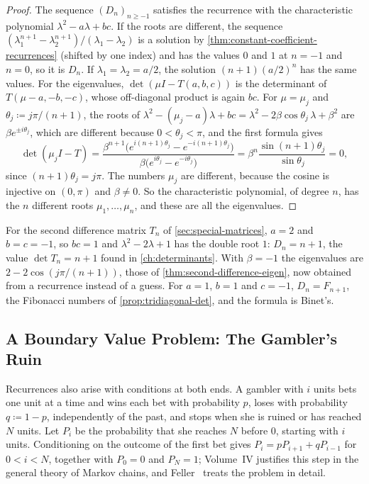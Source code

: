 \begin{proof}
The sequence $(D_n)_{n\ge-1}$ satisfies the recurrence with the characteristic polynomial $\lambda^2-a\lambda+bc$. If the roots are different, the sequence $(\lambda_1^{n+1}-\lambda_2^{n+1})/(\lambda_1-\lambda_2)$ is a solution by \cref{thm:constant-coefficient-recurrences} (shifted by one index) and has the values $0$ and $1$ at $n=-1$ and $n=0$, so it is $D_n$. If $\lambda_1=\lambda_2=a/2$, the solution $(n+1)(a/2)^n$ has the same values. For the eigenvalues, $\det(\mu I-T(a,b,c))$ is the determinant of $T(\mu-a,-b,-c)$, whose off-diagonal product is again $bc$. For $\mu=\mu_j$ and $\theta_j\coloneqq j\pi/(n+1)$, the roots of $\lambda^2-(\mu_j-a)\lambda+bc=\lambda^2-2\beta\cos\theta_j\,\lambda+\beta^2$ are $\beta e^{\pm i\theta_j}$, which are different because $0<\theta_j<\pi$, and the first formula gives
\[
\det(\mu_jI-T)=\frac{\beta^{n+1}\bigl(e^{i(n+1)\theta_j}-e^{-i(n+1)\theta_j}\bigr)}{\beta\bigl(e^{i\theta_j}-e^{-i\theta_j}\bigr)}=\beta^n\frac{\sin(n+1)\theta_j}{\sin\theta_j}=0 ,
\]
since $(n+1)\theta_j=j\pi$. The numbers $\mu_j$ are different, because the cosine is injective on $(0,\pi)$ and $\beta\ne0$. So the characteristic polynomial, of degree $n$, has the $n$ different roots $\mu_1,\ldots,\mu_n$, and these are all the eigenvalues.
\end{proof}

For the second difference matrix $T_n$ of \cref{sec:special-matrices}, $a=2$ and $b=c=-1$, so $bc=1$ and $\lambda^2-2\lambda+1$ has the double root $1$: $D_n=n+1$, the value $\det T_n=n+1$ found in \cref{ch:determinants}. With $\beta=-1$ the eigenvalues are $2-2\cos(j\pi/(n+1))$, those of \cref{thm:second-difference-eigen}, now obtained from a recurrence instead of a guess. For $a=1$, $b=1$ and $c=-1$, $D_n=F_{n+1}$, the Fibonacci numbers of \cref{prop:tridiagonal-det}, and the formula is Binet's.

\subsection{A Boundary Value Problem: The Gambler's Ruin}

Recurrences also arise with conditions at both ends. A gambler with $i$ units bets one unit at a time and wins each bet with probability $p$, loses with probability $q\coloneqq1-p$, independently of the past, and stops when she is ruined or has reached $N$ units. Let $P_i$ be the probability that she reaches $N$ before $0$, starting with $i$ units. Conditioning on the outcome of the first bet gives $P_i=pP_{i+1}+qP_{i-1}$ for $0<i<N$, together with $P_0=0$ and $P_N=1$; Volume~IV justifies this step in the general theory of Markov chains, and Feller~\cite[Chap.~XIV]{feller1968} treats the problem in detail.

